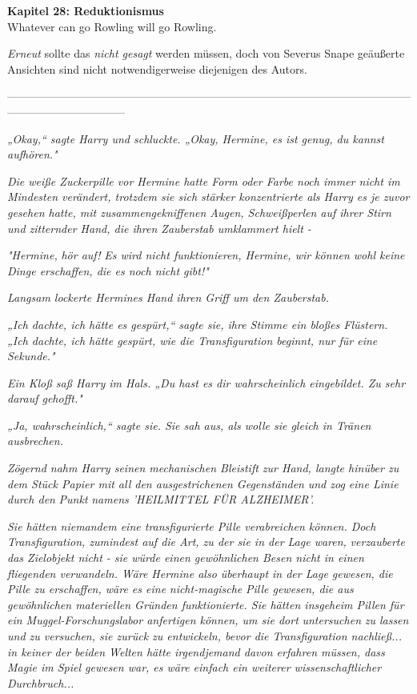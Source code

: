 

\hypertarget{reduktionismus}{%

\textbf{Kapitel 28: Reduktionismus}\\

\hfill\break Whatever can go Rowling will go Rowling.

\emph{Erneut} sollte das \emph{nicht gesagt} werden müssen, doch von Severus Snape geäußerte Ansichten sind nicht notwendigerweise diejenigen des Autors.

--------------------------------------------------------------------------------------------------------------------------------------------

\hfill\break \emph{„Okay,“ sagte Harry und schluckte. „Okay, Hermine, es ist genug, du kannst aufhören."}

\emph{Die weiße Zuckerpille vor Hermine hatte Form oder Farbe noch immer nicht im Mindesten verändert, trotzdem sie sich stärker konzentrierte als Harry es je zuvor gesehen hatte, mit zusammengekniffenen Augen, Schweißperlen auf ihrer Stirn und zitternder Hand, die ihren Zauberstab umklammert hielt -}

\emph{"Hermine,} \emph{\emph{hör auf!}} \emph{Es wird nicht funktionieren, Hermine, wir können wohl keine Dinge erschaffen, die es noch nicht gibt!"}

\emph{Langsam lockerte Hermines Hand ihren Griff um den Zauberstab.}

\emph{„Ich dachte, ich hätte es gespürt,“ sagte sie, ihre Stimme ein bloßes Flüstern. „Ich dachte, ich hätte gespürt, wie die Transfiguration beginnt, nur für eine Sekunde."}

\emph{Ein Kloß saß Harry im Hals. „Du hast es dir wahrscheinlich eingebildet. Zu sehr darauf gehofft."}

\emph{„Ja, wahrscheinlich,“ sagte sie. Sie sah aus, als wolle sie gleich in Tränen ausbrechen.}

\emph{Zögernd nahm Harry seinen mechanischen Bleistift zur Hand, langte hinüber zu dem Stück Papier mit all den ausgestrichenen Gegenständen} \emph{und zog eine Linie durch den} \emph{Punkt} \emph{namens 'HEILMITTEL FÜR ALZHEIMER'.}

\emph{Sie hätten niemandem eine transfigurierte Pille verabreichen können. Doch Transfiguration, zumindest auf die Art, zu der sie in der Lage waren,} \emph{verzauberte das Zielobjekt nicht - sie würde einen gewöhnlichen Besen nicht in einen fliegenden verwandeln. Wäre Hermine also überhaupt in der Lage gewesen, die Pille zu erschaffen, wäre es eine} \emph{\emph{nicht-magische}} \emph{Pille gewesen, die aus gewöhnlichen materiellen Gründen funktionierte. Sie hätten insgeheim Pillen für ein Muggel-Forschungslabor anfertigen können, um sie dort} \emph{\emph{untersuchen}} \emph{zu lassen und zu versuchen, sie zurück zu entwickeln, bevor die Transfiguration nachließ... in keiner der beiden Welten hätte irgendjemand davon erfahren müssen, dass Magie im Spiel gewesen war, es wäre einfach ein weiterer wissenschaftlicher Durchbruch...}

}
